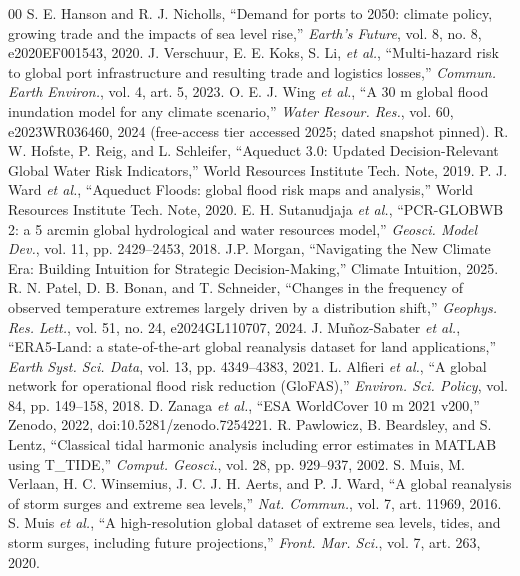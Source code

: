 \documentclass[conference]{IEEEtran}
\begin{document}
\begin{thebibliography}{00}
 S. E. Hanson and R. J. Nicholls, ``Demand for ports to 2050: climate policy, growing trade and the impacts of sea level rise,'' \emph{Earth's Future}, vol. 8, no. 8, e2020EF001543, 2020.
 J. Verschuur, E. E. Koks, S. Li, \emph{et al.}, ``Multi-hazard risk to global port infrastructure and resulting trade and logistics losses,'' \emph{Commun. Earth Environ.}, vol. 4, art. 5, 2023.
 O. E. J. Wing \emph{et al.}, ``A 30 m global flood inundation model for any climate scenario,'' \emph{Water Resour. Res.}, vol. 60, e2023WR036460, 2024 (free-access tier accessed 2025; dated snapshot pinned).
 R. W. Hofste, P. Reig, and L. Schleifer, ``Aqueduct 3.0: Updated Decision-Relevant Global Water Risk Indicators,'' World Resources Institute Tech. Note, 2019.
 P. J. Ward \emph{et al.}, ``Aqueduct Floods: global flood risk maps and analysis,'' World Resources Institute Tech. Note, 2020.
 E. H. Sutanudjaja \emph{et al.}, ``PCR-GLOBWB 2: a 5 arcmin global hydrological and water resources model,'' \emph{Geosci. Model Dev.}, vol. 11, pp. 2429--2453, 2018.
 J.P. Morgan, ``Navigating the New Climate Era: Building Intuition for Strategic Decision-Making,'' Climate Intuition, 2025. %
 R. N. Patel, D. B. Bonan, and T. Schneider, ``Changes in the frequency of observed temperature extremes largely driven by a distribution shift,'' \emph{Geophys. Res. Lett.}, vol. 51, no. 24, e2024GL110707, 2024.
 J. Mu\~noz-Sabater \emph{et al.}, ``ERA5-Land: a state-of-the-art global reanalysis dataset for land applications,'' \emph{Earth Syst. Sci. Data}, vol. 13, pp. 4349--4383, 2021.
 L. Alfieri \emph{et al.}, ``A global network for operational flood risk reduction (GloFAS),'' \emph{Environ. Sci. Policy}, vol. 84, pp. 149--158, 2018.
 D. Zanaga \emph{et al.}, ``ESA WorldCover 10 m 2021 v200,'' Zenodo, 2022, doi:10.5281/zenodo.7254221.
 R. Pawlowicz, B. Beardsley, and S. Lentz, ``Classical tidal harmonic analysis including error estimates in MATLAB using T\_TIDE,'' \emph{Comput. Geosci.}, vol. 28, pp. 929--937, 2002.
 S. Muis, M. Verlaan, H. C. Winsemius, J. C. J. H. Aerts, and P. J. Ward, ``A global reanalysis of storm surges and extreme sea levels,'' \emph{Nat. Commun.}, vol. 7, art. 11969, 2016.
 S. Muis \emph{et al.}, ``A high-resolution global dataset of extreme sea levels, tides, and storm surges, including future projections,'' \emph{Front. Mar. Sci.}, vol. 7, art. 263, 2020.

\end{thebibliography}
\end{document}
